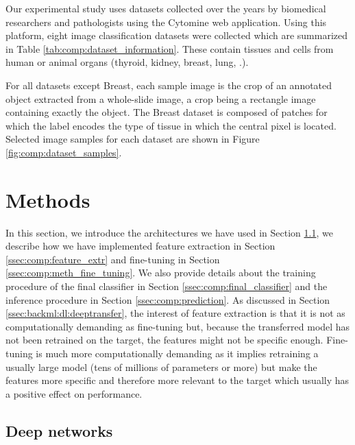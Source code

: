 Our experimental study uses datasets collected over the years by biomedical researchers and pathologists using the Cytomine \cite{maree2016collaborative} web application. Using this platform, eight image classification datasets were collected which are summarized in Table \ref{tab:comp:dataset_information}. These contain tissues and cells from human or animal organs (thyroid, kidney, breast, lung, \etc.).

For all datasets except Breast, each sample image is the crop of an annotated object extracted from a whole-slide image, a crop being a rectangle image containing exactly the object. The Breast dataset is composed of patches for which the label encodes the type of tissue in which the central pixel is located. Selected image samples for each dataset are shown in Figure \ref{fig:comp:dataset_samples}. 

\section{Methods}
\label{sec:comp:methods}

In this section, we introduce the architectures we have used in Section \ref{ssec:comp:deep_networks}, we describe how we have implemented feature extraction in Section \ref{ssec:comp:feature_extr} and fine-tuning in Section \ref{ssec:comp:meth_fine_tuning}. We also provide details about the training procedure of the final classifier in Section \ref{ssec:comp:final_classifier} and the inference procedure in Section \ref{ssec:comp:prediction}. As discussed in Section \ref{ssec:backml:dl:deeptransfer}, the interest of feature extraction is that it is not as computationally demanding as fine-tuning but, because the transferred model has not been retrained on the target, the features might not be specific enough. Fine-tuning is much more computationally demanding as it implies retraining a usually large model (\ie tens of millions of parameters or more) but make the features more specific and therefore more relevant to the target which usually has a positive effect on performance. 

\subsection{Deep networks}
\label{ssec:comp:deep_networks}

